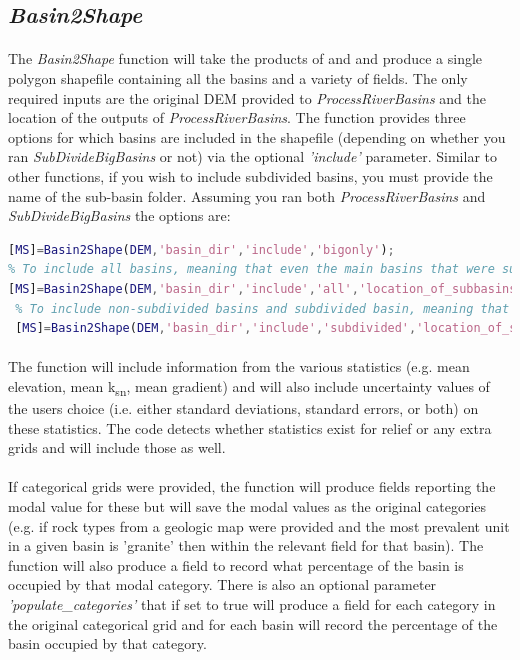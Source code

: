 \subsection{\textit{Basin2Shape}} \label{sec:B2S}
\paragraph{}The \textit{Basin2Shape} function will take the products of  and  and produce a single polygon shapefile containing all the basins and a variety of fields. The only required inputs are the original DEM provided to \textit{ProcessRiverBasins} and the location of the outputs of \textit{ProcessRiverBasins}. The function provides three options for which basins are included in the shapefile (depending on whether you ran \textit{SubDivideBigBasins} or not) via the optional \textit{'include'} parameter. Similar to other functions, if you wish to include subdivided basins, you must provide the name of the sub-basin folder. Assuming you ran both \textit{ProcessRiverBasins} and \textit{SubDivideBigBasins} the options are:

\begin{lstlisting}[language=Matlab]
% To include only the original products of ProcessRiverBasins
[MS]=Basin2Shape(DEM,'basin_dir','include','bigonly');
% To include all basins, meaning that even the main basins that were subdivided will be inlcuded
[MS]=Basin2Shape(DEM,'basin_dir','include','all','location_of_subbasins','my_sub_basins');
 % To include non-subdivided basins and subdivided basin, meaning that main basins that were subdivided will  NOT be included
 [MS]=Basin2Shape(DEM,'basin_dir','include','subdivided','location_of_subbasins','my_sub_basins');
\end{lstlisting}

\paragraph{}The function will include information from the various statistics (e.g. mean elevation, mean k\textsubscript{sn}, mean gradient) and will also include uncertainty values of the users choice (i.e. either standard deviations, standard errors, or both) on these statistics. The code detects whether statistics exist for relief or any extra grids and will include those as well. 

\paragraph{}If categorical grids were provided, the function will produce fields reporting the modal value for these but will save the modal values as the original categories (e.g. if rock types from a geologic map were provided and the most prevalent unit in a given basin is 'granite' then within the relevant field for that basin). The function will also produce a field to record what percentage of the basin is occupied by that modal category. There is also an optional parameter \textit{'populate\_categories'} that if set to true will produce a field for each category in the original categorical grid and for each basin will record the percentage of the basin occupied by that category.

